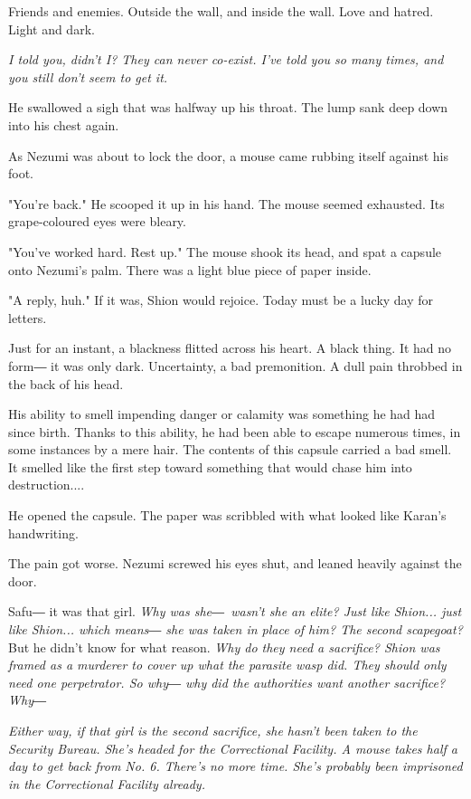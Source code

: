 Friends and enemies. Outside the wall, and inside the wall. Love and
hatred. Light and dark.

\emph{I told you, didn't I? They can never co-exist. I've told you so many
times, and you still don't seem to get it.}

He swallowed a sigh that was halfway up his throat. The lump sank deep
down into his chest again.

As Nezumi was about to lock the door, a mouse came rubbing itself
against his foot.

"You're back." He scooped it up in his hand. The mouse seemed exhausted.
Its grape-coloured eyes were bleary.

"You've worked hard. Rest up." The mouse shook its head, and spat a
capsule onto Nezumi's palm. There was a light blue piece of paper
inside.

"A reply, huh." If it was, Shion would rejoice. Today must be a lucky
day for letters.

Just for an instant, a blackness flitted across his heart. A black
thing. It had no form― it was only dark. Uncertainty, a bad premonition.
A dull pain throbbed in the back of his head.

His ability to smell impending danger or calamity was something he had
had since birth. Thanks to this ability, he had been able to escape
numerous times, in some instances by a mere hair. The contents of this
capsule carried a bad smell. It smelled like the first step toward
something that would chase him into destruction....

He opened the capsule. The paper was scribbled with what looked like
Karan's handwriting.


The pain got worse. Nezumi screwed his eyes shut, and leaned heavily
against the door.

Safu― it was that girl. \emph{Why was she―~wasn't she an elite? Just like
Shion... just like Shion... which means― she was taken in place of him?
The second scapegoat?} But he didn't know for what reason. \emph{Why do they
need a sacrifice? Shion was framed as a murderer to cover up what the
parasite wasp did. They should only need one perpetrator. So why― why
did the authorities want another sacrifice? Why―}

\emph{Either way, if that girl is the second sacrifice, she hasn't been taken
to the Security Bureau. She's headed for the Correctional Facility. A
mouse takes half a day to get back from No. 6. There's no more time.
She's probably been imprisoned in the Correctional Facility already.}

